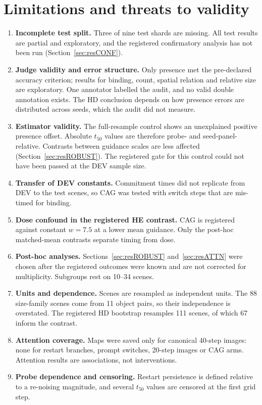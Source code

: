 \section{Limitations and threats to validity}\label{sec:limits}
\begin{enumerate}
\item \textbf{Incomplete test split.} Three of nine test shards are missing. All test results are partial and exploratory, and the registered confirmatory analysis has not been run (Section~\ref{sec:resCONF}).
\item \textbf{Judge validity and error structure.} Only presence met the pre-declared accuracy criterion; results for binding, count, spatial relation and relative size are exploratory. One annotator labelled the audit, and no valid double annotation exists. The HD conclusion depends on how presence errors are distributed across seeds, which the audit did not measure.
\item \textbf{Estimator validity.} The full-resample control shows an unexplained positive presence offset. Absolute $t_{50}$ values are therefore probe- and seed-panel-relative. Contrasts between guidance scales are less affected (Section~\ref{sec:resROBUST}). The registered gate for this control could not have been passed at the DEV sample size.
\item \textbf{Transfer of DEV constants.} Commitment times did not replicate from DEV to the test scenes, so CAG was tested with switch steps that are mis-timed for binding.
\item \textbf{Dose confound in the registered HE contrast.} CAG is registered against constant $w=7.5$ at a lower mean guidance. Only the post-hoc matched-mean contrasts separate timing from dose.
\item \textbf{Post-hoc analyses.} Sections~\ref{sec:resROBUST} and~\ref{sec:resATTN} were chosen after the registered outcomes were known and are not corrected for multiplicity. Subgroups rest on 10--34 scenes.
\item \textbf{Units and dependence.} Scenes are resampled as independent units. The 88 size-family scenes come from 11 object pairs, so their independence is overstated. The registered HD bootstrap resamples 111 scenes, of which 67 inform the contrast.
\item \textbf{Attention coverage.} Maps were saved only for canonical 40-step images: none for restart branches, prompt switches, 20-step images or CAG arms. Attention results are associations, not interventions.
\item \textbf{Probe dependence and censoring.} Restart persistence is defined relative to a re-noising magnitude, and several $t_{50}$ values are censored at the first grid step.

\end{enumerate}
